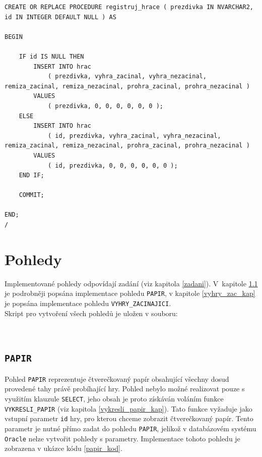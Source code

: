 \documentclass[
11pt,
a4paper,
pdftex,
czech,
titlepage
]{report}
\begin{document}
\renewcommand{\lstlistingname}{Ukázka kódu}
\begin{lstlisting}
CREATE OR REPLACE PROCEDURE registruj_hrace ( prezdivka IN NVARCHAR2, id IN INTEGER DEFAULT NULL ) AS

BEGIN

    IF id IS NULL THEN
        INSERT INTO hrac 
            ( prezdivka, vyhra_zacinal, vyhra_nezacinal, remiza_zacinal, remiza_nezacinal, prohra_zacinal, prohra_nezacinal ) 
        VALUES 
            ( prezdivka, 0, 0, 0, 0, 0, 0 );
    ELSE
        INSERT INTO hrac 
            ( id, prezdivka, vyhra_zacinal, vyhra_nezacinal, remiza_zacinal, remiza_nezacinal, prohra_zacinal, prohra_nezacinal ) 
        VALUES 
            ( id, prezdivka, 0, 0, 0, 0, 0, 0 );
    END IF;
    
    COMMIT;

END;
/
\end{lstlisting}


\section{Pohledy}
Implementované pohledy odpovídají zadání (viz kapitola \ref{zadani}). V~kapitole \ref{pohled_papir_kap} je podrobněji popsána implementace pohledu \texttt{PAPIR}, v kapitole \ref{vyhry_zac_kap} je popsána implementace pohledu \texttt{VYHRY\_ZACINAJICI}.\\

\noindent Skript pro vytvoření všech pohledů je uložen v souboru:
\begin{center}
\noindent {}\\[0.5\baselineskip]
\end{center}

\subsection{\texttt{PAPIR}}\label{pohled_papir_kap}
Pohled \texttt{PAPIR} reprezentuje čtverečkovaný papír obsahující všechny dosud provedené tahy právě probíhající hry. Pohled nebylo možné realizovat pouze s využitím klauzule \texttt{SELECT}, jeho obsah je proto získáván voláním funkce \texttt{VYKRESLI\_PAPIR} (viz kapitola \ref{vykresli_papir_kap}). Tato funkce vyžaduje jako vstupní parametr \texttt{id} hry, pro kterou chceme zobrazit čtverečkovaný papír. Tento parametr je nutné přímo zadat do pohledu \texttt{PAPIR}, jelikož v databázovém systému \texttt{Oracle} nelze vytvořit pohledy s parametry. Implementace tohoto pohledu je zobrazena v ukázce kódu \ref{papir_kod}.
\end{document}
